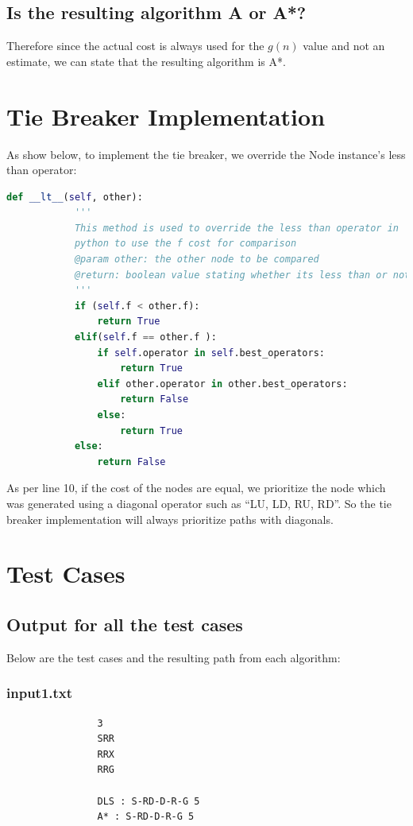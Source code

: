 \documentclass{article}
\begin{document}
		\subsection{Is the resulting algorithm A or A*?}
		Therefore since the actual cost is always used for the $g(n)$ value and not an estimate, we can state that the resulting algorithm is A*. 
		\newpage
	\section{Tie Breaker Implementation}
	
	As show below, to implement the tie breaker, we override the Node instance's less than operator:
			\begin{lstlisting}[language=Python]
    def __lt__(self, other):
			'''
			This method is used to override the less than operator in
			python to use the f cost for comparison
			@param other: the other node to be compared
			@return: boolean value stating whether its less than or not
			'''
			if (self.f < other.f):
				return True
			elif(self.f == other.f ):
				if self.operator in self.best_operators:
					return True
				elif other.operator in other.best_operators:
					return False
				else:
					return True
			else:
				return False
	\end{lstlisting}
	
	As per line 10, if the cost of the nodes are equal, we prioritize the node which was generated using a diagonal operator such as ``LU, LD, RU, RD''. So the tie breaker implementation will always prioritize paths with diagonals.
	
	\section{Test Cases}
	\subsection{Output for all the test cases}
		Below are the test cases and the resulting path from each algorithm:
		
		\subsubsection{input1.txt}
			\begin{lstlisting}
				3
				SRR
				RRX
				RRG
					
				DLS : S-RD-D-R-G 5
				A* : S-RD-D-R-G 5
		\end{lstlisting}
	
\end{document}
